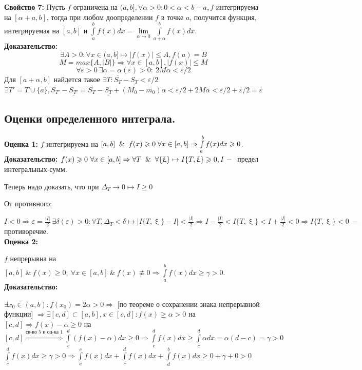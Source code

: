 \documentclass[a4paper,12pt]{article} %
\renewcommand {\geq}{\geqslant}
\renewcommand {\leq}{\leqslant}
\begin{document}
	\textbf{Свойство 7:}
	Пусть $f$ ограничена на $(a,b], \forall \alpha > 0: 0<\alpha<b-a, f $ интегрируема на $[\alpha+a, b]$, тогда при любом доопределении $f$ в точке $a$, получится функция, интегрируемая на $[a,b]$ и $\int\limits_a^b f(x) dx = \lim \limits_{\alpha \rightarrow 0} \int\limits_{a+\alpha}^b f(x)dx$.\\
	\textbf{Доказательство:}
	$$\exists A>0: \forall x \in (a,b] \longmapsto |f(x)|\leq A, f(a) = B$$
	$$M = max\{A, |B|\} \Rightarrow \forall x \in [a,b], |f(x)|\leq M$$
	$$\forall\varepsilon > 0 ~\exists \alpha = \alpha(\varepsilon)>0:~2M\alpha< \varepsilon/2$$
	Для $[a+\alpha, b]$ найдется такое  $\exists T: \overline{S_T}- \underline{S_T}< \varepsilon/2$
	$$\exists T' = T \cup \{a\}, \overline{S_{T'}}- \underline{S_{T'}}= \overline{S_T}- \underline{S_T}+(M_0-m_0)\alpha<\varepsilon/2+2M\alpha<\varepsilon/2+\varepsilon/2=\varepsilon $$
	\subsection{Оценки определенного интеграла.}
	\textbf{Оценка 1:}
	$f$  интегрируема на $[a,b] \And f(x)\geq 0 \; \forall x \in [a,b]\Rightarrow \int\limits_a^b f(x)dx \geq 0$.\\
	
	\textbf{Доказательство:}
	$f(x)\geq 0 ~ \forall x \in [a,b]\Rightarrow \forall T \And \forall \{\upxi\}\mapsto I\{T,\upxi \}\geq 0, I ~-~$ предел интегральных сумм.
	
	Теперь надо доказать, что при $\Delta_T \rightarrow 0 \mapsto I\geq 0$
	
	От противного:
	
	$I<0 \Rightarrow \varepsilon = \frac{|I|}{2} ~\exists\delta(\varepsilon)>0: \forall T, \Delta_T< \delta \mapsto |I\{T,\upxi\}-I|< \frac{|I|}{2}\Rightarrow I-\frac{|I|}{2}<I\{T,\upxi\}<I+\frac{|I|}{2}<0\Rightarrow I\{T,\upxi\}<0 ~-~ $ противоречие.\\
	
	\textbf{Оценка 2:}
	
	$f$ непрерывна на $[a,b] ~ \& ~ f(x) \geqslant 0, ~\forall x \in [a,b] ~ \& ~ f(x) \not \equiv 0 \Rightarrow \int \limits_a^b f(x) dx \geqslant \gamma >0$.\\
	
	\textbf{Доказательство:}
	
	$\exists x_0 \in (a,b): f(x_0) = 2\alpha>0 \Rightarrow$ [по теореме о сохранении знака непрерывной функции] $\Rightarrow \exists [c,d] \subset [a,b], x  \in [c,d]: f(x)\geq \alpha > 0 $ на $[c,d]\Rightarrow f(x)-\alpha \geq 0$ на $[c,d]\stackrel{\text{св-во 5 и оц-ка 1}}{\Rightarrow}\int \limits_c^d (f(x)-\alpha) dx\geq 0 \Rightarrow \int \limits_c^d f(x)dx\geq \int\limits_c^d\alpha dx = \alpha(d-c) = \gamma > 0$\\[2mm]
	$\int \limits_c^d f(x) dx \geq \gamma > 0 \Rightarrow \int \limits_a^c  f(x) dx  + \int \limits_c^d  f(x) dx+ \int \limits_d^b  f(x) dx \geq 0+\gamma+0>0$
	
\end{document}
